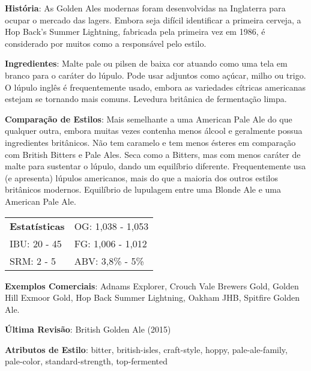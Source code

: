 \textbf{História}: As Golden Ales modernas foram desenvolvidas na Inglaterra para ocupar o mercado das lagers. Embora seja difícil identificar a primeira cerveja, a Hop Back's Summer Lightning, fabricada pela primeira vez em 1986, é considerado por muitos como a responsável pelo estilo.

\textbf{Ingredientes}: Malte pale ou pilsen de baixa cor atuando como uma tela em branco para o caráter do lúpulo. Pode usar adjuntos como açúcar, milho ou trigo. O lúpulo inglês é frequentemente usado, embora as variedades cítricas americanas estejam se tornando mais comuns. Levedura britânica de fermentação limpa.

\textbf{Comparação de Estilos}: Mais semelhante a uma American Pale Ale do que qualquer outra, embora muitas vezes contenha menos álcool e geralmente possua ingredientes britânicos. Não tem caramelo e tem menos ésteres em comparação com British Bitters e Pale Ales. Seca como a Bitters, mas com menos caráter de malte para sustentar o lúpulo, dando um equilíbrio diferente. Frequentemente usa (e apresenta) lúpulos americanos, mais do que a maioria dos outros estilos britânicos modernos. Equilíbrio de lupulagem entre uma Blonde Ale e uma American Pale Ale.

\begin{tabular}{@{}p{35mm}p{35mm}@{}}
  \textbf{Estatísticas} & OG: 1,038 - 1,053 \\
  IBU: 20 - 45  & FG: 1,006 - 1,012  \\
  SRM: 2 - 5  & ABV: 3,8\% - 5\%
\end{tabular}

\textbf{Exemplos Comerciais}: Adnams Explorer, Crouch Vale Brewers Gold, Golden Hill Exmoor Gold, Hop Back Summer Lightning, Oakham JHB, Spitfire Golden Ale.

\textbf{Última Revisão}: British Golden Ale (2015)

\textbf{Atributos de Estilo}: bitter, british-isles, craft-style, hoppy, pale-ale-family, pale-color, standard-strength, top-fermented
